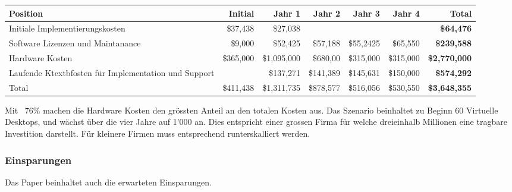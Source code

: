 \begin{table}[H]
	\centering
	\small\renewcommand{\arraystretch}{1.4}  
	\begin{tabularx}{\textwidth}{X | r | r | r | r | r | r}
		\hline
		\rowcolor{tableheadcolor}
		\textbf{Position} & \textbf{Initial} & \textbf{Jahr 1} & \textbf{Jahr 2} & \textbf{Jahr 3} & \textbf{Jahr 4} & \textbf{Total} \\
		\hline
		Initiale Implementierungskosten & \$37,438 & \$27,038 &  &  &  & \textbf{\$64,476} \\
		Software Lizenzen und \linebreak
		Maintanance & \$9,000 & \$52,425 & \$57,188 & \$55,2425 & \$65,550 & \textbf{\$239,588} \\
		Hardware Kosten & \$365,000 & \$1,095,000 & \$680,00 & \$315,000 & \$315,000 & \textbf{\$2,770,000} \\
		Laufende Ktextbfosten für \linebreak
		Implementation und Support &  & \$137,271 & \$141,389 & \$145,631 & \$150,000 & \textbf{\$574,292} \\
		\hline
		\rowcolor{tableheadcolor}
		Total & \$411,438 & \$1,311,735 & \$878,577 & \$516,056 & \$530,550 & \textbf{\$3,648,355} \\
	\end{tabularx}
\end{table}

Mit ~76\% machen die Hardware Kosten den grössten Anteil an den totalen Kosten aus.
Das Szenario beinhaltet zu Beginn 60 Virtuelle Desktops, und wächst über die vier Jahre auf 1'000 an. Dies entspricht einer grossen Firma für welche dreieinhalb Millionen eine tragbare Investition darstellt. Für kleinere Firmen muss entsprechend runterskalliert werden.

\subsubsection{Einsparungen}
Das Paper beinhaltet auch die erwarteten Einsparungen.

